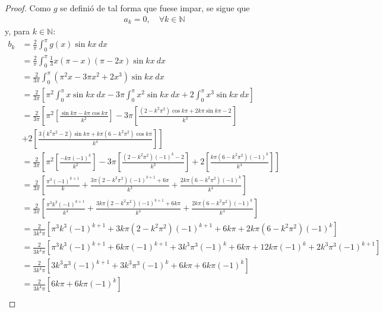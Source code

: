 \documentclass[12pt]{report}
\newcounter{it}
\theoremstyle{largebreak}
\begin{document}
\begin{proof}
        Como $g$ se definió de tal forma que fuese impar, se sigue que
        \begin{equation*}
            \begin{split}
                a_k=0,\quad\forall k\in\mathbb{N}
            \end{split}
        \end{equation*}
        y, para $k\in\mathbb{N}$:
        \begin{equation*}
            \begin{split}
                b_k&=\frac{2}{\pi}\int_{0}^{\pi}g(x)\sin kx\:dx \\
                &=\frac{2}{\pi}\int_{0}^{\pi}\frac{1}{3}x(\pi-x)(\pi-2x) \sin kx\:dx\\
                &=\frac{2}{3\pi}\int_{0}^{\pi}(\pi^2x-3\pi x^2+2x^3)\sin kx\:dx\\
                &=\frac{2}{3\pi}\left[\pi^2\int_{0}^{\pi}x\sin kx\:dx-3\pi\int_{0}^{\pi}x^2\sin kx\:dx+2\int_{0}^{\pi}x^3\sin kx\:dx \right]\\
                &=\frac{2}{3\pi}\left[\pi^2\left[\frac{\sin k\pi-k\pi\cos k\pi}{k^2} \right] -3\pi\left[\frac{(2-k^2\pi^2)\cos k\pi+2k\pi\sin k\pi-2}{k^3}\right]\right.\\
                &\left.+2\left[\frac{3(k^2\pi^2-2)\sin k\pi+k\pi(6-k^2\pi^2)\cos k\pi}{k^4}\right]\right]\\
                &=\frac{2}{3\pi}\left[\pi^2\left[\frac{-k\pi(-1)^k}{k^2} \right] -3\pi\left[\frac{(2-k^2\pi^2)(-1)^k-2}{k^3}\right]+2\left[\frac{k\pi(6-k^2\pi^2)(-1)^k}{k^4}\right]\right]\\
                &=\frac{2}{3\pi}\left[\frac{\pi^3(-1)^{k+1}}{k}+\frac{3\pi(2-k^2\pi^2)(-1)^{k+1}+6\pi}{k^3}+\frac{2k\pi(6-k^2\pi^2)(-1)^k}{k^4}\right]\\
                &=\frac{2}{3\pi}\left[\frac{\pi^3k^3(-1)^{k+1}}{k^4}+\frac{3k\pi(2-k^2\pi^2)(-1)^{k+1}+6k\pi}{k^4}+\frac{2k\pi(6-k^2\pi^2)(-1)^k}{k^4}\right]\\
                &=\frac{2}{3k^4\pi}\left[\pi^3k^3(-1)^{k+1}+3k\pi(2-k^2\pi^2)(-1)^{k+1}+6k\pi+2k\pi(6-k^2\pi^2)(-1)^k\right]\\
                &=\frac{2}{3k^4\pi}\left[\pi^3k^3(-1)^{k+1}+6k\pi(-1)^{k+1}+3k^3\pi^3(-1)^{k}+6k\pi+12k\pi(-1)^k+2k^3\pi^3(-1)^{ k+1}\right]\\
                &=\frac{2}{3k^4\pi}\left[3k^3\pi^3(-1)^{k+1}+3k^3\pi^3(-1)^{k}+6k\pi+6k\pi(-1)^k\right]\\
                &=\frac{2}{3k^4\pi}\left[6k\pi+6k\pi(-1)^k\right]\\

\end{split}
\end{equation*}
\end{proof}
\end{document}
